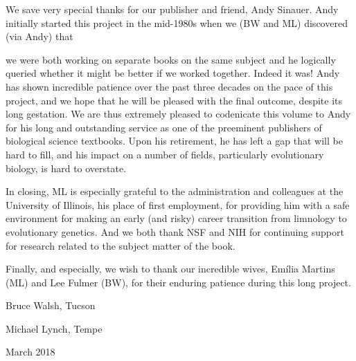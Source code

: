 \documentclass{article}
\begin{document}
We save very special thanks for our publisher and friend, Andy Sinauer. Andy initially started this project in the mid-1980s when we (BW and ML) discovered (via Andy) that

we were both working on separate books on the same subject and he logically queried whether it might be better if we worked together. Indeed it was! Andy has shown incredible patience over the past three decades on the pace of this project, and we hope that he will be pleased with the final outcome, despite its long gestation. We are thus extremely pleased to codenicate this volume to Andy for his long and outstanding service as one of the preeminent publishers of biological science textbooks. Upon his retirement, he has left a gap that will be hard to fill, and his impact on a number of fields, particularly evolutionary biology, is hard to overstate.

In closing, ML is especially grateful to the administration and colleagues at the University of Illinois, his place of first employment, for providing him with a safe environment for making an early (and risky) career transition from limnology to evolutionary genetics. And we both thank NSF and NIH for continuing support for research related to the subject matter of the book.

Finally, and especially, we wish to thank our incredible wives, Emília Martins (ML) and Lee Fulmer (BW), for their enduring patience during this long project.

Bruce Walsh, Tucson

Michael Lynch, Tempe

March 2018
\end{document}
